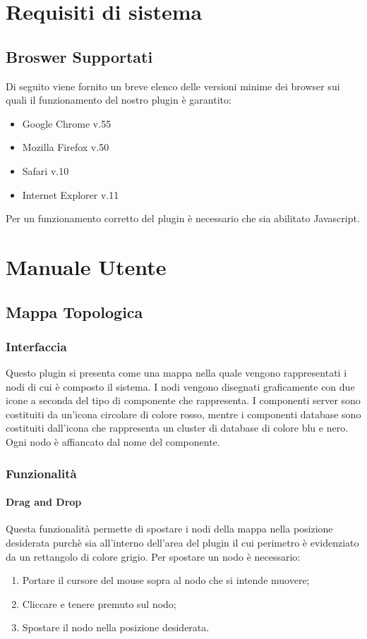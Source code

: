 \section{Requisiti di sistema}
\subsection{Broswer Supportati}

Di seguito viene fornito un breve elenco delle versioni minime dei browser sui quali il funzionamento del nostro plugin è garantito:
\begin{itemize}
	
	\item Google Chrome v.55
	\item Mozilla Firefox v.50
	\item Safari v.10
	\item Internet Explorer v.11
	
\end{itemize}

Per un funzionamento corretto del plugin è necessario che sia abilitato Javascript.


\section{Manuale Utente}
\subsection{Mappa Topologica}
\subsubsection{Interfaccia}
Questo plugin si presenta come una mappa nella quale vengono rappresentati i nodi di cui è composto il sistema.
I nodi vengono disegnati graficamente con due icone a seconda del tipo di componente che rappresenta. I componenti server sono costituiti da un'icona circolare di colore rosso, mentre i componenti database sono costituiti dall'icona che rappresenta un cluster di database di colore blu e nero. Ogni nodo è affiancato dal nome del componente.

\subsubsection{Funzionalità}
    \paragraph {Drag and Drop} \Spazio
Questa funzionalità permette di spostare i nodi della mappa nella posizione desiderata purchè sia all'interno dell'area del plugin il cui perimetro è evidenziato da un rettangolo di colore grigio.
Per spostare un nodo è necessario: 
\begin{enumerate}
	
	\item Portare il cursore del mouse sopra al nodo che si intende muovere;
	\item Cliccare e tenere premuto sul nodo;
	\item Spostare il nodo nella posizione desiderata.
	
\end{enumerate}

